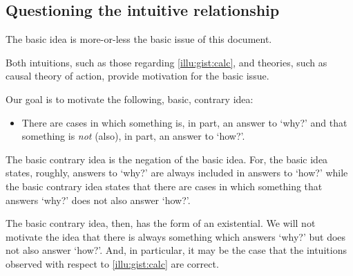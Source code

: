 \subsection{Questioning the intuitive relationship}

\begin{note}
  The basic idea is more-or-less the basic issue of this document.

  Both intuitions, such as those regarding \autoref{illu:gist:calc}, and theories, such as \citeauthor{Davidson:1963aa} causal theory of action, provide motivation for the basic issue.

  Our goal is to motivate the following, basic, contrary idea:

  \begin{itemize}
  \item
    There are cases in which something is, in part, an answer to `why?' and that something is \emph{not} (also), in part, an answer to `how?'.
  \end{itemize}

  The basic contrary idea is the negation of the basic idea.
  For, the basic idea states, roughly, answers to `why?' are always included in answers to `how?' while the basic contrary idea states that there are cases in which something that answers `why?' does not also answer `how?'.

  The basic contrary idea, then, has the form of an existential.
  We will not motivate the idea that there is always something which answers `why?' but does not also answer `how?'.
  And, in particular, it may be the case that the intuitions observed with respect to \autoref{illu:gist:calc} are correct.
\end{note}


